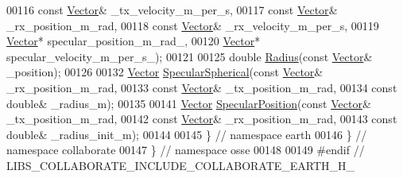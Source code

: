 \begin{DoxyCode}
00116                    \textcolor{keyword}{const} \hyperlink{classosse_1_1collaborate_1_1_vector}{Vector}& \_tx\_velocity\_m\_per\_s,
00117                    \textcolor{keyword}{const} \hyperlink{classosse_1_1collaborate_1_1_vector}{Vector}& \_rx\_position\_m\_rad,
00118                    \textcolor{keyword}{const} \hyperlink{classosse_1_1collaborate_1_1_vector}{Vector}& \_rx\_velocity\_m\_per\_s,
00119                    \hyperlink{classosse_1_1collaborate_1_1_vector}{Vector}* specular\_position\_m\_rad\_,
00120                    \hyperlink{classosse_1_1collaborate_1_1_vector}{Vector}* specular\_velocity\_m\_per\_s\_);
00121 
00125 \textcolor{keywordtype}{double} \hyperlink{earth_8h_a6ef212db2b50cdf7ddbc2a187214a25b}{Radius}(\textcolor{keyword}{const} \hyperlink{classosse_1_1collaborate_1_1_vector}{Vector}& \_position);
00126 
00132 \hyperlink{classosse_1_1collaborate_1_1_vector}{Vector} \hyperlink{earth_8h_a4474729d4f8d2d7b22c1d5162cd17151}{SpecularSpherical}(\textcolor{keyword}{const} \hyperlink{classosse_1_1collaborate_1_1_vector}{Vector}& \_rx\_position\_m\_rad,
00133                          \textcolor{keyword}{const} \hyperlink{classosse_1_1collaborate_1_1_vector}{Vector}& \_tx\_position\_m\_rad,
00134                          \textcolor{keyword}{const} \textcolor{keywordtype}{double}& \_radius\_m);
00135 
00141 \hyperlink{classosse_1_1collaborate_1_1_vector}{Vector} \hyperlink{earth_8h_aa43f67f563c35ce39af2af80a9393c4b}{SpecularPosition}(\textcolor{keyword}{const} \hyperlink{classosse_1_1collaborate_1_1_vector}{Vector}& \_tx\_position\_m\_rad,
00142                         \textcolor{keyword}{const} \hyperlink{classosse_1_1collaborate_1_1_vector}{Vector}& \_rx\_position\_m\_rad,
00143                         \textcolor{keyword}{const} \textcolor{keywordtype}{double}& \_radius\_init\_m);
00144 
00145 \}  \textcolor{comment}{// namespace earth}
00146 \}  \textcolor{comment}{// namespace collaborate}
00147 \}  \textcolor{comment}{// namespace osse}
00148 
00149 \textcolor{preprocessor}{#endif  // LIBS\_COLLABORATE\_INCLUDE\_COLLABORATE\_EARTH\_H\_}
\end{DoxyCode}
